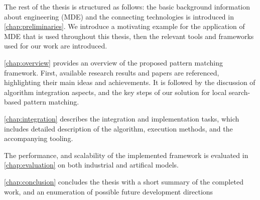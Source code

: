 The rest of the thesis is structured as follows: the basic background information about \modeldriven engineering (MDE) and the connecting technologies is introduced in \autoref{chap:preliminaries}. We introduce a motivating example for the application of MDE that is used throughout this thesis, then the relevant tools and frameworks used for our work are introduced. 

\autoref{chap:overview} provides an overview of the proposed pattern matching framework. First, available research results and papers are referenced, highlighting their main ideas and achievements. It is followed by the discussion of algorithm integration aspects, and the key steps of our solution for local search-based pattern matching.

\autoref{chap:integration} describes the integration and implementation tasks, which includes detailed description of the algorithm, execution methods, and the accompanying tooling. 

The performance, and scalability of the implemented framework is evaluated in \autoref{chap:evaluation} on both industrial and artifical models.  

\autoref{chap:conclusion} concludes the thesis with a short summary of the completed work, and an enumeration of possible future development directions
